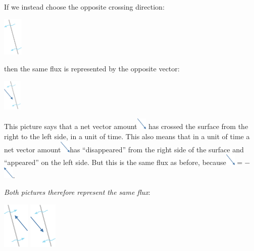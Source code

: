 If we instead choose the opposite crossing direction:\noprelistbreak
\begin{center}
  \medskip
  \includegraphics[height=5em]{images/surface_tilted_crossleft.pdf}
\end{center}
then the same flux is represented by the opposite vector:\noprelistbreak
\begin{center}
  \medskip
  \includegraphics[height=4em]{images/flux_vec_left.pdf}
\end{center}
This picture says that a net vector amount\enspace\includegraphics[align=c,height=1.5em]{images/vec_SE.pdf}\enspace
has crossed the surface from the right to the left side, in a unit of time. This also means that in a unit of time a net vector amount\enspace\includegraphics[align=c,height=1.5em]{images/vec_SE.pdf}\enspace has \enquote{disappeared} from the right side of the surface and \enquote{appeared} on the left side. But this is the same flux as before, because\enspace\includegraphics[align=c,height=1.5em]{images/vec_SE.pdf}${}= -{}$\includegraphics[align=c,height=1.5em]{images/vec_NW.pdf}.

\emph{Both pictures therefore represent the same flux}:\noprelistbreak
\begin{center}\label{fig:vector_fluxes}
  \bigskip
\hspace*{\fill}\includegraphics[align=c,height=6em]{images/flux_vec_right.pdf}
\qquad
\includegraphics[align=c,height=6em]{images/flux_vec_left.pdf}
\hspace*{\fill}
\end{center}

